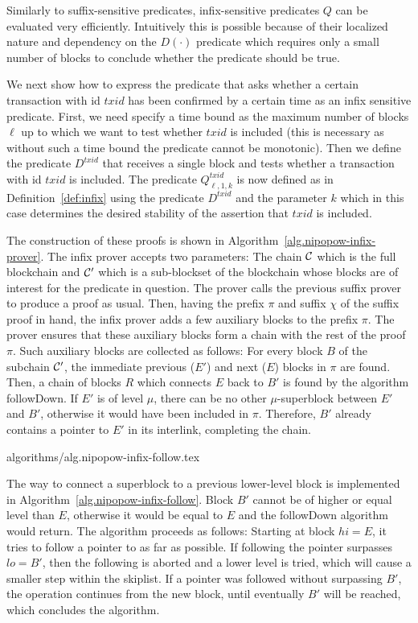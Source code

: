 Similarly to suffix-sensitive predicates, infix-sensitive predicates $Q$ can be
evaluated very efficiently. Intuitively this is possible because of their
localized nature and dependency on the $D(\cdot)$ predicate which requires only
a small number of blocks to conclude whether the predicate should be true.

We next show how to express the predicate that asks whether a certain
transaction with id $txid$ has been confirmed by a certain time as an infix
sensitive predicate. First, we need specify a time bound  as the maximum number
of blocks $\ell$ up to which we want to test whether $txid$ is included (this is
necessary as without such a time bound the predicate cannot be monotonic). Then
we define the predicate $D^{txid}$ that receives  a single block and tests
whether a transaction with id $txid$ is included. The predicate $Q^{txid}_{\ell,
1, k}$  is now defined as in Definition~\ref{def:infix}  using the predicate
$D^{txid}$ and the parameter $k$ which in this case  determines the desired
stability of the assertion that $txid$ is included.

The construction of these proofs is shown in
Algorithm~\ref{alg.nipopow-infix-prover}. The infix prover accepts two
parameters: The chain $\mathcal{C}$ which is the full blockchain and $\mathcal{C}'$ which
is a sub-blockset of the blockchain whose blocks are of interest for the
predicate in question. The prover calls the previous suffix prover to produce a
proof as usual. Then, having the prefix $\pi$ and suffix $\chi$ of the suffix
proof in hand, the infix prover adds a few auxiliary blocks to the prefix $\pi$.
The prover ensures that these auxiliary blocks form a chain with the rest of the
proof $\pi$. Such auxiliary blocks are collected as follows: For every block $B$
of the subchain $\mathcal{C}'$, the immediate previous ($E'$) and next ($E$) blocks
in $\pi$ are found. Then, a chain of blocks $R$ which connects $E$ back to $B'$
is found by the algorithm followDown. If $E'$ is of level $\mu$, there can be no
other $\mu$-superblock between $E'$ and $B'$, otherwise it would have been
included in $\pi$. Therefore, $B'$ already contains a pointer to $E'$ in its
interlink, completing the chain.

{algorithms/alg.nipopow-infix-follow.tex}

The way to connect a superblock to a previous lower-level block is implemented
in Algorithm~\ref{alg.nipopow-infix-follow}.  Block $B'$ cannot be of higher or
equal level than $E$, otherwise it would be equal to $E$ and the followDown
algorithm would return. The algorithm proceeds as follows: Starting at block $hi =
E$, it tries to follow a pointer to as far as possible. If following the pointer
surpasses $lo = B'$, then the following is aborted and a lower level is tried,
which will cause a smaller step within the skiplist. If a pointer was followed
without surpassing $B'$, the operation continues from the new block, until
eventually $B'$ will be reached, which concludes the algorithm.

